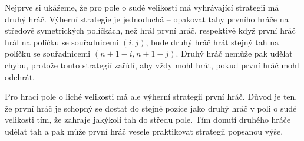 \documentclass{fkssolpub}
\author{Ondřej Sedláček}
\begin{document}
Nejprve si ukážeme, že pro pole o sudé velikosti má vyhrávající strategii má druhý
hráč. Výherní strategie je jednoduchá -- opakovat tahy prvního hráče na středově
symetrických políčkách, než hrál první hráč, respektivě když první hráč hrál
na políčku se souřadnicemi $(i, j)$, bude druhý hráč hrát stejný tah na políčku
se souřadnicemi $(n + 1 - i, n + 1 - j)$. Druhý hráč nemůže pak udělat chybu,
protože touto strategií zařídí, aby vždy mohl hrát, pokud první hráč mohl odehrát.

Pro hrací pole o liché velikosti má ale výherní strategii první hráč. Důvod je
ten, že první hráč je schopný se dostat do stejné pozice jako druhý hráč v poli
o sudé velikosti tím, že zahraje jakýkoli tah do středu pole. Tím donutí druhého
hráče udělat tah a pak může první hráč vesele praktikovat strategii popsanou výše.
\end{document}
